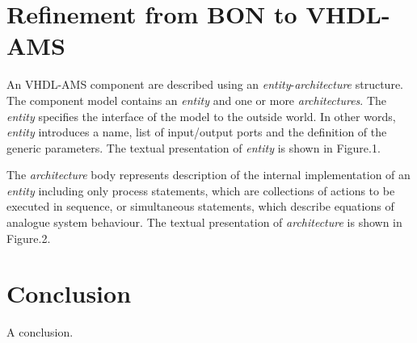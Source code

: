 \documentclass{article}
\newcommand{\todo}{\textbf{TODO:}}
\newcommand{\ent}{\emph{entity}\xspace}
\newcommand{\arch}{\emph{architecture}\xspace}
\newcommand{\archs}{\emph{architectures}\xspace}
\begin{document}
\section{Refinement from BON to VHDL-AMS}
 
An VHDL-AMS component are described using an \ent-\arch structure. 
The component model contains an \ent and one or more \archs. 
The \ent specifies the interface of the model to the outside world. 
In other words, \ent introduces a name, list of input/output ports 
and the definition of the generic parameters. The textual 
presentation of \ent is shown in Figure.1. 

 
The \arch body represents description of the internal implementation 
of an \ent including only process statements, which are collections 
of actions to be executed in sequence, or simultaneous statements, 
which describe equations of analogue system behaviour. 
The textual presentation of \arch is shown in Figure.2.

 


\section{Conclusion}

A conclusion.




\end{document}
